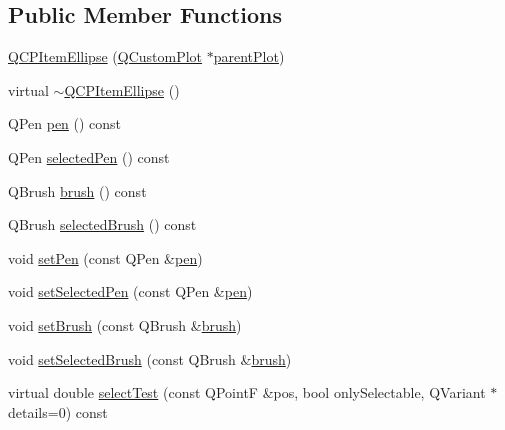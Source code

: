 \subsection*{Public Member Functions}
\begin{DoxyCompactItemize}
\item 
\hyperlink{class_q_c_p_item_ellipse_a759b77ef002515eba0263b5447ecb3fb}{Q\+C\+P\+Item\+Ellipse} (\hyperlink{class_q_custom_plot}{Q\+Custom\+Plot} $\ast$\hyperlink{class_q_c_p_layerable_ab7e0e94461566093d36ffc0f5312b109}{parent\+Plot})
\item 
virtual \hyperlink{class_q_c_p_item_ellipse_a3c17073a1805d32b4e09b6ccde0bef76}{$\sim$\+Q\+C\+P\+Item\+Ellipse} ()
\item 
Q\+Pen \hyperlink{class_q_c_p_item_ellipse_adb67471eabaf1214c99767f1653ca0ed}{pen} () const 
\item 
Q\+Pen \hyperlink{class_q_c_p_item_ellipse_ac52ab52225d238365ff3264b4b69130f}{selected\+Pen} () const 
\item 
Q\+Brush \hyperlink{class_q_c_p_item_ellipse_ac012e4fd59fdb1afb6554937bae8f7e1}{brush} () const 
\item 
Q\+Brush \hyperlink{class_q_c_p_item_ellipse_a0043e401a912d54ea3195bab0967b394}{selected\+Brush} () const 
\item 
void \hyperlink{class_q_c_p_item_ellipse_adb81a663ed2420fcfa011e49f678d1a6}{set\+Pen} (const Q\+Pen \&\hyperlink{class_q_c_p_item_ellipse_adb67471eabaf1214c99767f1653ca0ed}{pen})
\item 
void \hyperlink{class_q_c_p_item_ellipse_a6c542fba1dc918041c583f58a50dde99}{set\+Selected\+Pen} (const Q\+Pen \&\hyperlink{class_q_c_p_item_ellipse_adb67471eabaf1214c99767f1653ca0ed}{pen})
\item 
void \hyperlink{class_q_c_p_item_ellipse_a49fc74e6965834e873d027d026def798}{set\+Brush} (const Q\+Brush \&\hyperlink{class_q_c_p_item_ellipse_ac012e4fd59fdb1afb6554937bae8f7e1}{brush})
\item 
void \hyperlink{class_q_c_p_item_ellipse_a9693501cfaa43a099655c75bed0dab3f}{set\+Selected\+Brush} (const Q\+Brush \&\hyperlink{class_q_c_p_item_ellipse_ac012e4fd59fdb1afb6554937bae8f7e1}{brush})
\item 
virtual double \hyperlink{class_q_c_p_item_ellipse_acd7e5f9528630b2ab5987e2a5782eb7c}{select\+Test} (const Q\+Point\+F \&pos, bool only\+Selectable, Q\+Variant $\ast$details=0) const 
\end{DoxyCompactItemize}

